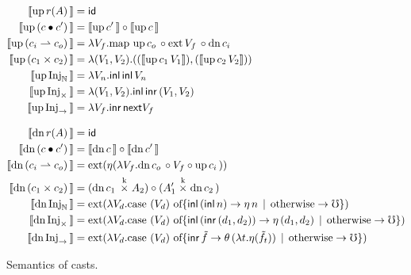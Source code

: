\begin{figure*}
  \begin{align*}
    \sem{\upc{r(A)}} &= \id \\
    \sem{\upc{(c \comp c')}} &= \sem{\upc{c'}} \circ \sem{\upc{c}} \\
    \sem{\upc{(c_i \ra c_o)}} &=
      \lambda V_f . \text{map } \upc{c_o} \circ \ext{V_f}{} \circ \dnc{c_i} \\
    \sem{\upc{(c_1 \times c_2)}} &= 
      \lambda (V_1, V_2) . ((\sem{\upc{c_1} V_1}) , 
                            (\sem{\upc{c_2} V_2})) \\
    \sem{\upc{\inat}} &= 
      \lambda V_n . \inl\, \inl\, V_n \\
    \sem{\upc{\itimes}} &= 
      \lambda (V_1, V_2) . \inl\, \inr\, (V_1 , V_2) \\
    \sem{\upc{\iarr}} &= 
      \lambda V_f . \inr\, \nxt V_f \\[2ex]
    \sem{\dnc{r(A)}} &= \id \\
    \sem{\dnc{(c \comp c')}} &= \sem{\dnc{c}} \circ \sem{\dnc{c'}} \\
    \sem{\dnc{(c_i \ra c_o)}} &=
     \text{ext}(\eta(\lambda V_f . \dnc{c_o} \circ V_f \circ \upc{c_i})) \\
    \sem{\dnc{(c_1 \times c_2)}} &= (\dnc{c_1} \timesk A_2) \circ (A_1' \timesk \dnc{c_2}) \\
    \sem{\dnc{\inat}} &= \text{ext}(
      \lambda V_d . \text{case $({V_d})$ of}
      \{ \inl\, (\inl\, n) \to \eta\, n
         \alt \text{otherwise} \to \mho \}) \\
    \sem{\dnc{\itimes}} &= \text{ext}(
      \lambda V_d . \text{case $({V_d})$ of}
      \{ \inl\, (\inr\, (d_1, d_2)) \to \eta\, (d_1, d_2)
         \alt \text{otherwise} \to \mho \}) \\
    \sem{\dnc{\iarr}} &= \text{ext}(
      \lambda V_d . \text{case $({V_d})$ of}
      \{ \inr\, \tilde{f} \to \theta\, (\lambda t. \eta (\tilde{f}_t))
         \alt \text{otherwise} \to \mho \}) \\
  \end{align*}

  \caption{Semantics of casts.}
  \label{fig:term-semantics}
\end{figure*}





